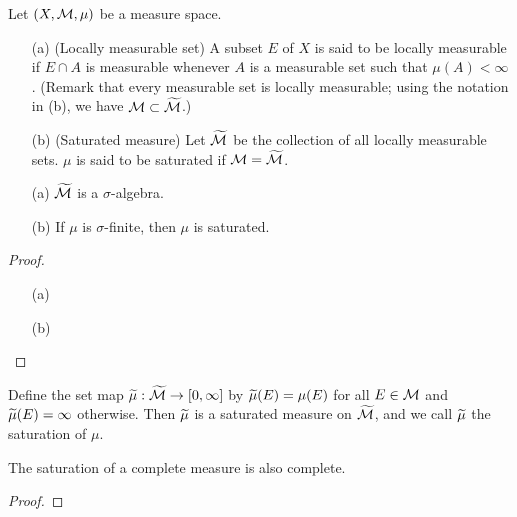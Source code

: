 \begin{defi}
    Let $(X, {\mathcal{M}}, \mu)$ be a measure space.
    \begin{enumerate}
        \item[(a)]
        {
            (Locally measurable set)
            A subset $E$ of $X$ is said to be locally measurable if $E\cap A$ is measurable whenever $A$ is a measurable set such that $\mu(A)<\infty$.
            (Remark that every measurable set is locally measurable; using the notation in (b), we have ${\mathcal{M}}\subset\widetilde{{\mathcal{M}}}$.)
        }
        \item[(b)]
        {
            (Saturated measure)
            Let $\widetilde{{\mathcal{M}}}$ be the collection of all locally measurable sets.
            $\mu$ is said to be saturated if ${\mathcal{M}}=\widetilde{{\mathcal{M}}}$.
        }
    \end{enumerate}
\end{defi}
\color{red}
\begin{prop}
    \begin{enumerate}
        \item[(a)]
        {
            $\widetilde{{\mathcal{M}}}$ is a $\sigma$-algebra.
        }
        \item[(b)]
        {
            If $\mu$ is $\sigma$-finite, then $\mu$ is saturated.
        }
    \end{enumerate}
\end{prop}
\begin{proof}
    \begin{enumerate}
        \item[(a)]
        {
            
        }
        \item[(b)]
        {

        }
    \end{enumerate}
\end{proof}

Define the set map $\widetilde{\mu}: \widetilde{{\mathcal{M}}}\rightarrow[0, \infty]$ by $\widetilde{\mu}(E)=\mu(E)$ for all $E\in{\mathcal{M}}$ and $\widetilde{\mu}(E)=\infty$ otherwise.
Then $\widetilde{\mu}$ is a saturated measure on $\widetilde{{\mathcal{M}}}$, and we call $\widetilde{\mu}$ the saturation of $\mu$.
\begin{prop}
    The saturation of a complete measure is also complete.
\end{prop}
\begin{proof}
    
\end{proof}
\color{black}